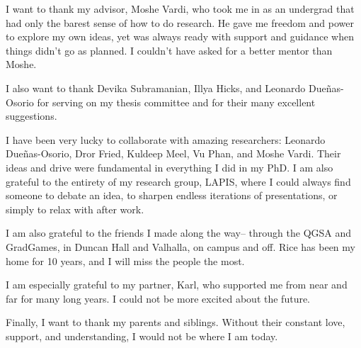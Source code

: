 \acknowledge
I want to thank my advisor, Moshe Vardi, who took me in as an undergrad that had only the barest sense of how to do research.
He gave me freedom and power to explore my own ideas, yet was always ready with support and guidance when things didn't go as planned.
I couldn't have asked for a better mentor than Moshe.

I also want to thank Devika Subramanian, Illya Hicks, and Leonardo Due{\~n}as-Osorio for serving on my thesis committee and for their many excellent suggestions.

I have been very lucky to collaborate with amazing researchers: Leonardo Due{\~n}as-Osorio, Dror Fried, Kuldeep Meel, Vu Phan, and Moshe Vardi.
Their ideas and drive were fundamental in everything I did in my PhD.
I am also grateful to the entirety of my research group, LAPIS, where I could always find someone to debate an idea, to sharpen endless iterations of presentations, or simply to relax with after work.

I am also grateful to the friends I made along the way-- through the QGSA and GradGames, in Duncan Hall and Valhalla, on campus and off. Rice has been my home for 10 years, and I will miss the people the most.

I am especially grateful to my partner, Karl, who supported me from near and far for many long years. I could not be more excited about the future.

Finally, I want to thank my parents and siblings. Without their constant love, support, and understanding, I would not be where I am today.